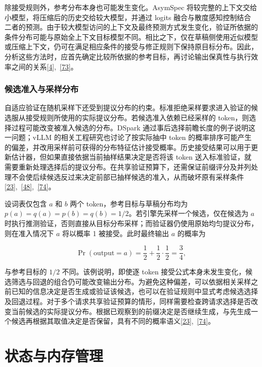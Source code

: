 \documentclass[11pt,a4paper,UTF8,fontset=none,scheme=plain,zihao=-4]{ctexart}
\begin{document}
除接受规则外，参考分布本身也可能发生变化。AsymSpec
将较完整的上下文交给小模型，将压缩后的历史交给较大模型，并通过 logits
融合与散度感知控制结合二者的预测。由于较大模型访问的上下文及最终预测方式发生变化，验证所依据的条件分布可能与原始全上下文目标模型不同。相比之下，仅在草稿侧使用近似模型或压缩上下文，仍可在满足相应条件的接受与修正规则下保持原目标分布。因此，分析这些方法时，应首先确定比较所依据的参考目标，再讨论输出保真性与执行效率之间的关系\protect\hyperlink{ref-leviathan}{{[}4{]}},~\protect\hyperlink{ref-asymspec}{{[}73{]}}。

\hypertarget{section-4-3-3}{%
\subsubsection{候选准入与采样分布}\label{section-4-3-3}}

自适应验证在随机采样下还受到提议分布的约束。标准拒绝采样要求进入验证的候选服从接受规则所使用的实际提议分布。若候选准入依赖已经采样的
token，则选择过程可能改变被准入候选的分布。DSpark
通过事后选择前瞻长度的例子说明这一问题；vLLM
的相关工程研究也讨论了按实际抽中 token
的概率排序可能产生的偏差，并改用采样前可获得的分布特征估计接受概率。历史接受结果可以用于更新估计器，但如果直接依据当前抽样结果决定是否将该
token
送入标准验证，就需要重新处理选择后的提议分布。在共享验证预算下，还需保证前缀评分及并列处理不会使后续候选反过来决定前部已抽样候选的准入，从而破坏原有采样条件\protect\hyperlink{ref-dspark}{{[}23{]}},~\protect\hyperlink{ref-forespark}{{[}48{]}},~\protect\hyperlink{ref-vllmavestimator}{{[}74{]}}。

设词表仅包含 \(a\) 和 \(b\) 两个 token，参考目标与草稿分布均为
\(p(a)=q(a)=p(b)=q(b)=1/2\)。若引擎先采样一个候选，仅在候选为 \(a\)
时执行推测验证，否则直接从目标分布采样；而验证器仍使用原始均匀提议分布，则在准入情况下
\(a\) 将以概率 1 被接受。此时最终输出 \(a\) 的概率为

\[
\Pr(\mathrm{output}=a)=\frac{1}{2}+\frac{1}{2}\cdot\frac{1}{2}=\frac{3}{4},
\]

与参考目标的 \(1/2\) 不同。该例说明，即使逐 token
接受公式本身未发生变化，候选筛选与回退的组合仍可能改变输出分布。为避免这种偏差，可以依据相关采样之前已知的信息决定是否生成或验证该候选，也可以在验证规则中显式考虑候选选择及回退过程。对于多个请求共享验证预算的情形，同样需要检查跨请求选择是否改变当前候选的实际提议分布。根据已观察到的前缀决定是否继续生成，与先生成一个候选再根据其取值决定是否保留，具有不同的概率语义\protect\hyperlink{ref-dspark}{{[}23{]}},~\protect\hyperlink{ref-vllmavestimator}{{[}74{]}}。

\hypertarget{section-5}{%
\section{状态与内存管理}\label{section-5}}
\end{document}
